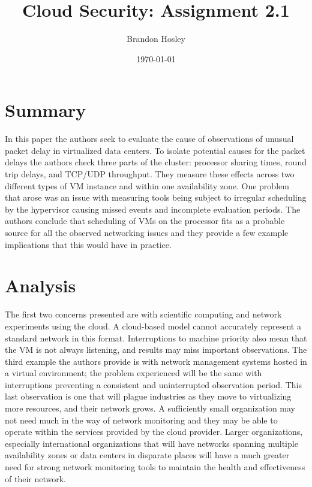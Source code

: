 \documentclass[]{article}
\title{Cloud Security: Assignment 2.1}
\author{Brandon Hosley}
\date{\today}
\begin{document}
	\maketitle
	
\section{Summary} 

In this paper\cite{Wang2010} the authors seek to evaluate the cause of observations of unusual packet delay in virtualized data centers.
To isolate potential causes for the packet delays the authors check three parts of the cluster: processor sharing times, round trip delays, and TCP/UDP throughput.
They measure these effects across two different types of VM instance and within one availability zone.
One problem that arose was an issue with measuring tools being subject to irregular scheduling by the hypervisor causing missed events and incomplete evaluation periods.
The authors conclude that scheduling of VMs on the processor fits as a probable source for all the observed networking issues and they provide a few example implications that this would have in practice.

\section{Analysis}
The first two concerns presented are with scientific computing and network experiments using the cloud.
A cloud-based model cannot accurately represent a standard network in this format.
Interruptions to machine priority also mean that the VM is not always listening, and results may miss important observations.
The third example the authors provide is with network management systems hosted in a virtual environment; the problem experienced will be the same with interruptions preventing a consistent and uninterrupted observation period.
This last observation is one that will plague industries as they move to virtualizing more resources, and their network grows. 
A sufficiently small organization may not need much in the way of network monitoring and they may be able to operate within the services provided by the cloud provider.
Larger organizations, especially international organizations that will have networks spanning multiple availability zones or data centers in disparate places will have a much greater need for strong network monitoring tools to maintain the health and effectiveness of their network.

\clearpage


\end{document}
